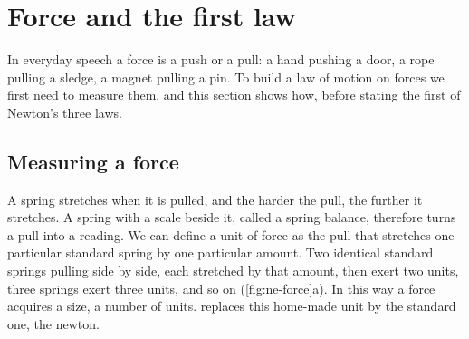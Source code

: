 \section{Force and the first law}
\label{sec:ne-force}

In everyday speech a force is a push or a pull: a hand pushing a door, a
rope pulling a sledge, a magnet pulling a pin. To build a law of motion on
forces we first need to measure them, and this section shows how, before
stating the first of Newton's three laws.

\subsection*{Measuring a force}

A spring stretches when it is pulled, and the harder the pull, the further
it stretches. A spring with a scale beside it, called a spring balance,
therefore turns a pull into a reading. We can define a unit of force as
the pull that stretches one particular standard spring by one particular
amount. Two identical standard springs pulling side by side, each
stretched by that amount, then exert two units, three springs exert three
units, and so on (\cref{fig:ne-force}a). In this way a force acquires a
size, a number of units.  replaces this home-made
unit by the
standard one, the newton.

